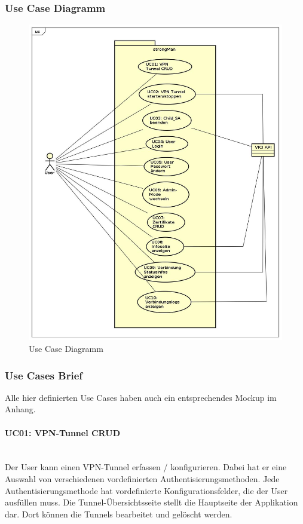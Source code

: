 \subsubsection{Use Case Diagramm}
\begin{figure}[H]
\centering
\includegraphics[width=370pt]{images/usecases.jpg}
\caption[Use Case Diagramm]{Use Case Diagramm}
\end{figure}


\subsubsection{Use Cases Brief}
Alle hier definierten Use Cases haben auch ein entsprechendes Mockup im Anhang.
\paragraph{UC01: VPN-Tunnel CRUD}\mbox{} \\
Der User kann einen VPN-Tunnel erfassen / konfigurieren. Dabei hat er eine Auswahl von verschiedenen vordefinierten Authentisierungsmethoden. Jede Authentisierungsmethode hat vordefinierte Konfigurationsfelder, die der User ausfüllen muss. Die Tunnel-Übersichtsseite stellt die Hauptseite der Applikation dar. Dort können die Tunnels bearbeitet und gelöscht werden.

